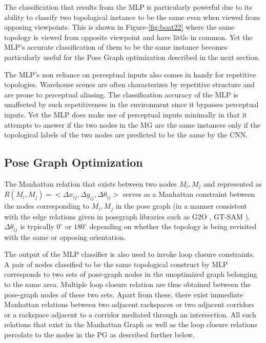 \documentclass[letterpaper, 10 pt, conference]{ieeeconf}  %
\begin{document}
	The classification that results from the MLP is particularly powerful due to its ability to classify two topological instance to be the same even when viewed from opposing viewpoints. This is shown in Figure-\ref{fig:boat22} where the same topology is viewed from opposite viewpoint and have little in common. Yet the MLP's accurate classification of them to be the same instance becomes particularly useful for the Pose Graph optimization described in the next section. 
	
	The MLP's non reliance on perceptual inputs also comes in handy for repetitive topologies. Warehouse scenes are often characterizes by repetitive structure and are prone to perceptual aliasing. The classification accuracy of the MLP is unaffected by such repetitiveness in the environment since it bypasses perceptual inputs. Yet the MLP does make use of perceptual inputs minimally in that it attempts to answer if the two nodes in the MG are the same instances only if the topological labels of the two nodes are predicted to be the same by the CNN.
	
	\subsection{Pose Graph Optimization}
	
	
	The Manhattan relation that exists between two nodes $M_{i},M_{j}$ and represented as $ R(M_{i},M_{j}) = <\Delta x_{ij}, \Delta y_{ij}, \Delta\theta_{ij}>$ serves as a Manhattan constraint between the nodes corresponding to $M_{i},M_{j}$ in the pose graph (in a manner consistent with the edge relations given in posegraph libraries such as G2O \cite{kummerle2011_g2o}, GT-SAM \cite{kaess2008isam}). $\Delta\theta_{ij}$ is typically $0^\circ$ or $180^\circ$ depending on whether the topology is being revisited with the same or opposing orientation.
	
	The output of the MLP classifier is also used to invoke loop closure constraints. A pair of nodes classified to be the same topological construct by MLP corresponds to two sets of pose-graph nodes in the unoptimized graph belonging to the same area. Multiple loop closure relation are thus obtained between the pose-graph nodes of these two sets. Apart from these, there exist immediate Manhattan relations between two adjacent rackspaces or two adjacent corridors or a rackspace adjacent to a corridor mediated through an intersection. All such relations that exist in the Manhattan Graph as well as the loop closure relations percolate to the nodes in the PG as described further below.
	
\end{document}
